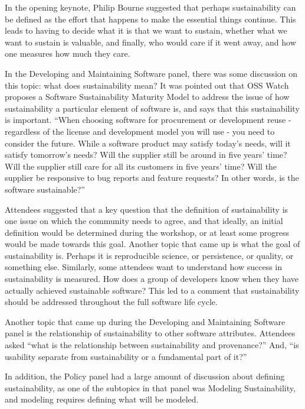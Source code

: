 \documentclass[11pt, oneside]{amsart}
\begin{document}
In the opening keynote, Philip Bourne suggested that perhaps sustainability can
be defined as the effort that happens to make the essential things continue.
This leads to having to decide what it is that we want to sustain, whether what
we want to sustain is valuable, and finally, who would care if it went away,
and how one measures how much they care.

In the Developing and Maintaining Software panel, there was some discussion on
this topic: what does sustainability mean? It was pointed out that OSS Watch
proposes a Software Sustainability Maturity Model to address the issue of how
sustainability a particular element of software is, and says that this
sustainability is important. ``When choosing software for procurement or
development reuse - regardless of the license and development model you will
use - you need to consider the future. While a software product may satisfy
today's needs, will it satisfy tomorrow's needs? Will the supplier still be
around in five years' time? Will the supplier still care for all its customers
in five years' time? Will the supplier be responsive to bug reports and feature
requests? In other words, is the software sustainable?''~\cite{OSS-ssmm-web}

Attendees suggested that a key question that the definition of sustainability
is one issue on which the community needs to agree, and that ideally, an
initial definition would be determined during the workshop, or at least some
progress would be made towards this goal.  Another topic that came up is what
the goal of sustainability is.  Perhaps it is reproducible science, or
persistence, or quality, or something else.  Similarly, some attendees want to
understand how success in sustainability is measured.  How does a group of
developers know when they have actually achieved sustainable software? This led
to a comment that sustainability should be addressed throughout the full
software life cycle.

Another topic that came up during the Developing and Maintaining Software panel
is the relationship of sustainability to other software attributes.  Attendees
asked ``what is the relationship between sustainability and provenance?'' And,
``is usability separate from sustainability or a fundamental part of it?''

In addition, the Policy panel had a large amount of discussion about defining
sustainability, as one of the subtopics in that panel was Modeling
Sustainability, and modeling requires defining what will be modeled.
\end{document}
